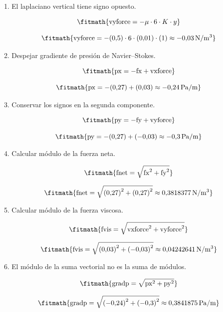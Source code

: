 \begin{enumerate}
\[\fitmath{\mathrm{vxforce}=\mu\cdot 6\cdot K\cdot x}\]

\[\fitmath{\mathrm{vxforce}=(0{,}5)\cdot 6\cdot (0{,}01)\cdot (1)\approx 0{,}03\,\mathrm{N/m^{3}}}\]

\item El laplaciano vertical tiene signo opuesto.

\[\fitmath{\mathrm{vyforce}=-\mu\cdot 6\cdot K\cdot y}\]

\[\fitmath{\mathrm{vyforce}=-(0{,}5)\cdot 6\cdot (0{,}01)\cdot (1)\approx -0{,}03\,\mathrm{N/m^{3}}}\]

\item Despejar gradiente de presión de Navier--Stokes.

\[\fitmath{\mathrm{px}=-\mathrm{fx}+\mathrm{vxforce}}\]

\[\fitmath{\mathrm{px}=-(0{,}27)+(0{,}03)\approx -0{,}24\,\mathrm{Pa/m}}\]

\item Conservar los signos en la segunda componente.

\[\fitmath{\mathrm{py}=-\mathrm{fy}+\mathrm{vyforce}}\]

\[\fitmath{\mathrm{py}=-(0{,}27)+(-0{,}03)\approx -0{,}3\,\mathrm{Pa/m}}\]

\item Calcular módulo de la fuerza neta.

\[\fitmath{\mathrm{fnet}=\sqrt{{\mathrm{fx}}^{2}+{\mathrm{fy}}^{2}}}\]

\[\fitmath{\mathrm{fnet}=\sqrt{{(0{,}27)}^{2}+{(0{,}27)}^{2}}\approx 0{,}3818377\,\mathrm{N/m^{3}}}\]

\item Calcular módulo de la fuerza viscosa.

\[\fitmath{\mathrm{fvis}=\sqrt{{\mathrm{vxforce}}^{2}+{\mathrm{vyforce}}^{2}}}\]

\[\fitmath{\mathrm{fvis}=\sqrt{{(0{,}03)}^{2}+{(-0{,}03)}^{2}}\approx 0{,}04242641\,\mathrm{N/m^{3}}}\]

\item El módulo de la suma vectorial no es la suma de módulos.

\[\fitmath{\mathrm{gradp}=\sqrt{{\mathrm{px}}^{2}+{\mathrm{py}}^{2}}}\]

\[\fitmath{\mathrm{gradp}=\sqrt{{(-0{,}24)}^{2}+{(-0{,}3)}^{2}}\approx 0{,}3841875\,\mathrm{Pa/m}}\]

\end{enumerate}
